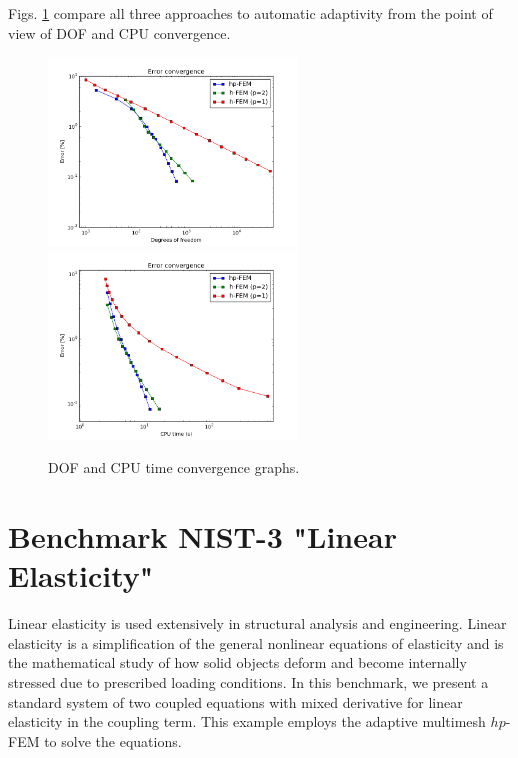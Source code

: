 \documentclass[12pt]{elsarticle}
\begin{document}

Figs. \ref{fig:nist-2-conv} compare all
three approaches to automatic adaptivity from the point
of view of DOF and CPU convergence.

\begin{figure}[!ht]
\centering
\includegraphics[height=5cm]{nist/nist-2/conv_dof_aniso.png}\ \
\includegraphics[height=5cm]{nist/nist-2/conv_cpu_aniso.png}
\caption{DOF and CPU time convergence graphs.}
\label{fig:nist-2-conv}
\end{figure}


\section{Benchmark NIST-3 "Linear Elasticity"}
\label{sec:bench-3}

Linear elasticity is used extensively in structural analysis
and engineering. Linear elasticity is a simplification
of the general nonlinear equations of elasticity and is the mathematical
study of how solid objects deform and become internally
stressed due to prescribed loading conditions.
In this benchmark, we present a standard system of two
coupled equations with mixed derivative for linear elasticity
in the coupling term. This example employs the adaptive multimesh $hp$-FEM
to solve the equations.
\end{document}

